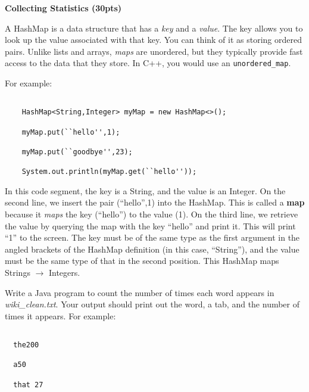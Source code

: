 \documentclass[10pt]{article}
\newenvironment{problem}[2][Problem]{\begin{trivlist}

\item[\hskip \labelsep {\bfseries #1}\hskip \labelsep {\bfseries #2.}]}{\end{trivlist}}
\begin{document}
\begin{problem}{Part 3}

\textbf{Collecting Statistics (30pts)}

A HashMap is a data structure that has a \textit{key} and a \textit{value}.  The key allows you to look up the value associated with that key.  You can think of it as storing ordered pairs.  Unlike lists and arrays, \textit{maps} are unordered, but they typically provide fast access to the data that they store. In C++, you would use an \texttt{unordered_map}.



For example:

\begin{verbatim}

    HashMap<String,Integer> myMap = new HashMap<>();

    myMap.put(``hello'',1);

    myMap.put(``goodbye'',23);

    System.out.println(myMap.get(``hello''));

\end{verbatim}

\end{problem}

 

 In this code segment, the key is a String, and the value is an Integer.  On the second line, we insert the pair (``hello'',1) into the HashMap.  This is called a \textbf{map} because it \textit{maps} the key (``hello'') to the value (1).  On the third line, we retrieve the value by querying the map with the key ``hello'' and print it.  This will print ``1'' to the screen.  The key must be of the same type as the first argument in the angled brackets of the HashMap definition (in this case, ``String''), and the value must be the same type of that in the second position.  This HashMap maps Strings $\rightarrow$ Integers.

 

 Write a Java program to count the number of times each word appears in \textit{wiki\_clean.txt}.  Your output should print out the word, a tab, and the number of times it appears.  For example:

 

\begin{verbatim}

  the200

  a50

  that 27

\end{verbatim}
\end{document}
